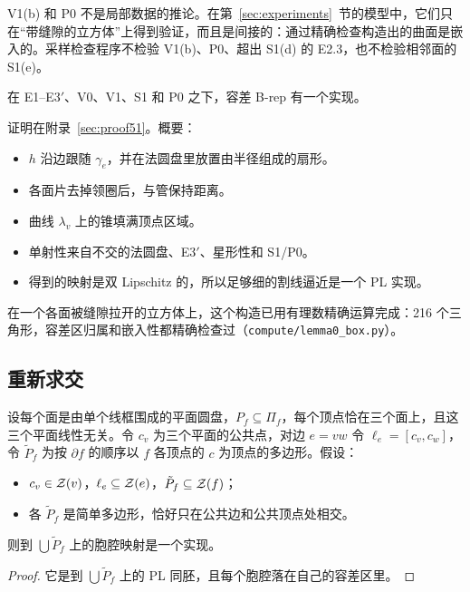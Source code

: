 V1(b) 和 P0 不是局部数据的推论。在第~\ref{sec:experiments}~节的模型中，它们只在``带缝隙的立方体''上得到验证，而且是间接的：通过精确检查构造出的曲面是嵌入的。采样检查程序不检验 V1(b)、P0、超出 S1(d) 的 E2.3，也不检验相邻面的 S1(e)。

\begin{theorem}\label{thm:lemma0}
在 E1--E3$'$、V0、V1、S1 和 P0 之下，容差 B-rep 有一个实现。
\end{theorem}
证明在附录~\ref{sec:proof51}。概要：
\begin{itemize}
\item $h$ 沿边跟随 $\gamma_e$，并在法圆盘里放置由半径组成的扇形。
\item 各面片去掉领圈后，与管保持距离。
\item 曲线 $\lambda_v$ 上的锥填满顶点区域。
\item 单射性来自不交的法圆盘、E3$'$、星形性和 S1/P0。
\item 得到的映射是双 Lipschitz 的，所以足够细的割线逼近是一个 PL 实现。
\end{itemize}

\begin{example}
在一个各面被缝隙拉开的立方体上，这个构造已用有理数精确运算完成：216 个三角形，容差区归属和嵌入性都精确检查过（\texttt{compute/lemma0\_box.py}）。
\end{example}

\subsection{重新求交}

\begin{proposition}[平面，三度顶点]\label{prop:B}
设每个面是由单个线框围成的平面圆盘，$P_f\subseteq\Pi_f$，每个顶点恰在三个面上，且这三个平面线性无关。令 $c_v$ 为三个平面的公共点，对边 $e=vw$ 令 $\ell_e=[c_v,c_w]$，令 $\tilde P_f$ 为按 $\partial f$ 的顺序以 $f$ 各顶点的 $c$ 为顶点的多边形。假设：
\begin{itemize}
\item $c_v\in\mathcal{Z}(v)$，$\ell_e\subseteq\mathcal{Z}(e)$，$\tilde P_f\subseteq\mathcal{Z}(f)$；
\item 各 $\tilde P_f$ 是简单多边形，恰好只在公共边和公共顶点处相交。
\end{itemize}
则到 $\bigcup\tilde P_f$ 上的胞腔映射是一个实现。
\end{proposition}
\begin{proof}
它是到 $\bigcup\tilde P_f$ 上的 PL 同胚，且每个胞腔落在自己的容差区里。
\end{proof}

